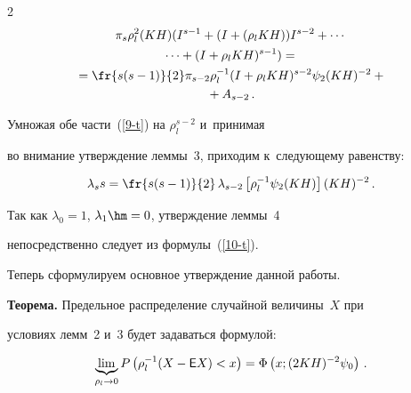 \begin{multicols}{2}
\begin{multline}

\pi_{s}\rho_l^2(KH)(I^{s-1}+(I+(\rho_lKH))I^{s-2}+\cdots{}\\

{}\cdots

+(I+\rho_lKH)^{s-1})

={}\\

{}=\fr{s(s-1)}{2}\pi_{s-2} \rho_l^{-1} (I+\rho_l KH)^{s-2}\psi_{2}

(KH)^{-2}+{}\\

{}+A_{s-2}\,.

\label{9-t}

\end{multline}



Умножая обе части~(\ref{9-t}) на $\rho_l^{s-2}$ и~принимая

во внимание утверждение леммы~3, приходим к~следующему равенству:

\begin{equation}

\lambda_s s = \fr{s(s-1)}{2} \,\lambda_{s-2}\left[\rho_l^{-1} \psi_{2}(KH)\right] (KH)^{-2}\,.

\label{10-t}

\end{equation}

Так как $\lambda_0=1$,  $\lambda_1\hm=0$, утверждение леммы~4

непосредственно следует из формулы~(\ref{10-t}).



\smallskip



Теперь сформулируем основное утверждение данной работы.



\smallskip



\noindent

\textbf{Теорема.} Предельное распределение случайной величины~$X$ при

условиях лемм~2 и~3 будет  задаваться формулой:

\begin{equation*}

\underbrace{\lim}_{\rho_l\rightarrow 0} P\left(\rho_l^{-1}(X-{\sf E}X)<x\right)

=

\Phi \left(x; (2KH)^{-2}\psi_0\right)\,.


\end{equation*}
\end{multicols}
